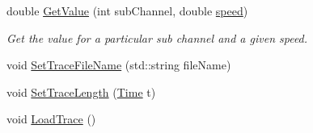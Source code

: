 \begin{DoxyCompactItemize}
\item 
double \hyperlink{classns3_1_1TraceFadingLossModel_a45f36bd1be9f2a8a17b7686079e8da0d}{Get\+Value} (int sub\+Channel, double \hyperlink{mmwave-amc-test_8cc_a6dc6e6f3c75c509ce943163afb5dade7}{speed})
\begin{DoxyCompactList}\small\item\em Get the value for a particular sub channel and a given speed. \end{DoxyCompactList}\item 
void \hyperlink{classns3_1_1TraceFadingLossModel_a9e1847bc39afa49d2eb1928b86f6caa1}{Set\+Trace\+File\+Name} (std\+::string file\+Name)
\item 
void \hyperlink{classns3_1_1TraceFadingLossModel_a4205edb5c856c3c54324a622d3b37bc4}{Set\+Trace\+Length} (\hyperlink{classns3_1_1Time}{Time} t)
\item 
void \hyperlink{classns3_1_1TraceFadingLossModel_acc7f5b8fcb432e4ce8eca85464d42b07}{Load\+Trace} ()
\end{DoxyCompactItemize}
